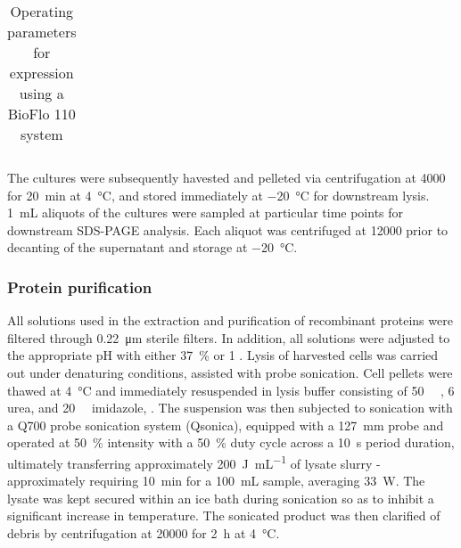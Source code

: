 \begin{refsection}
\begin{table}[h!]
\begin{tabular}{ ll }
  \hline
\end{tabular}
\caption{Operating parameters for expression using a BioFlo 110 system}
\label{tab:bioreactor_parameters}
\end{table}
The cultures were subsequently havested and pelleted via centrifugation at
\SI{4000}{\gforce} for \SI{20}{\minute} at \SI{4}{\celsius}, and stored
immediately at \SI{-20}{\celsius} for downstream lysis. \SI{1}{\mL} aliquots of
the cultures were sampled at particular time points for downstream SDS-PAGE
analysis. Each aliquot was centrifuged at \SI{12000}{\rpm} prior to decanting of
the supernatant and storage at \SI{-20}{\celsius}.

\subsubsection{Protein purification}
All solutions used in the extraction and purification of recombinant proteins
were filtered through \SI{0.22}{\um} sterile filters. In addition, all solutions
were adjusted to the appropriate pH with either \SI{37}{\percent}  or
\SI{1}{\moLar} . Lysis of harvested cells was carried out under
denaturing conditions, assisted with probe sonication. Cell pellets were thawed
at \SI{4}{\celsius} and immediately resuspended in lysis buffer consisting of
\SI{50}{\milli\moLar} , \SI{6}{\moLar} urea, and
\SI{20}{\milli\moLar} imidazole, . The suspension was then subjected to
sonication with a Q700 probe sonication system (Qsonica), equipped with a
\SI{127}{\mm} probe and operated at \SI{50}{\percent} intensity with a
\SI{50}{\percent} duty cycle across a \SI{10}{\second} period duration,
ultimately transferring approximately \SI{200}{\joule\per\mL} of lysate slurry -
approximately requiring \SI{10}{\minute} for a \SI{100}{\mL} sample, averaging
\SI{33}{\watt}. The lysate was kept secured within an ice bath during sonication
so as to inhibit a significant increase in temperature. The sonicated product
was then clarified of debris by centrifugation at \SI{20000}{\gforce} for
\SI{2}{\hour} at \SI{4}{\celsius}.


\end{refsection}
